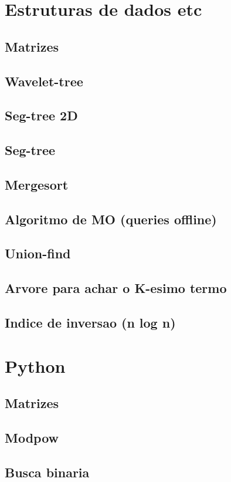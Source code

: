 \section{Estruturas de dados etc}
\subsection{Matrizes}
\raggedbottom
\clearpage
\subsection{Wavelet-tree}
\raggedbottom
\clearpage
\subsection{Seg-tree 2D}
\raggedbottom
\clearpage
\subsection{Seg-tree}
\raggedbottom
\clearpage
\subsection{Mergesort}
\raggedbottom
\clearpage
\subsection{Algoritmo de MO (queries offline)}
\raggedbottom
\clearpage
\subsection{Union-find}
\raggedbottom
\clearpage
\subsection{Arvore para achar o K-esimo termo}
\raggedbottom
\clearpage
\subsection{Indice de inversao (n log n)}
\raggedbottom
\clearpage
\clearpage
\section{Python}
\subsection{Matrizes}
\raggedbottom
\clearpage
\subsection{Modpow}
\raggedbottom
\clearpage
\subsection{Busca binaria}
\raggedbottom
\clearpage
\clearpage
